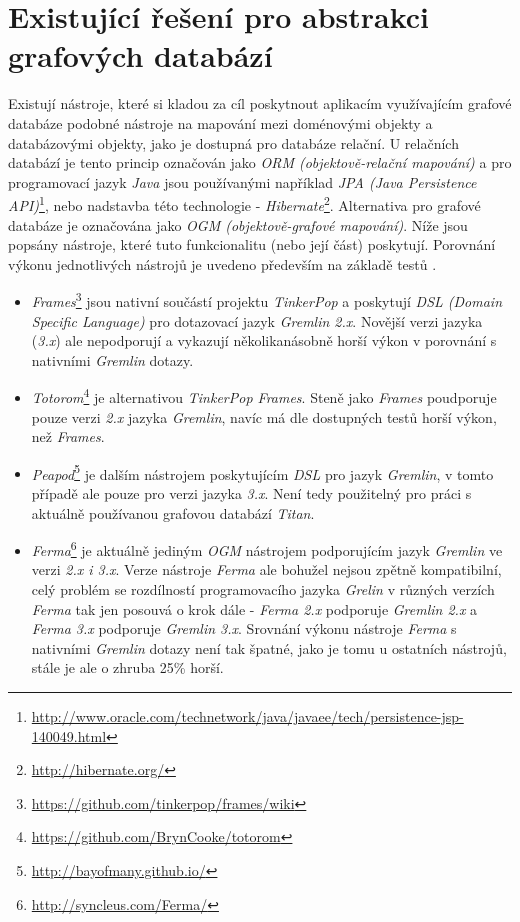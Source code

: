 \section{Existující řešení pro abstrakci grafových databází}
\label{sec:ana_state_of_art}
Existují nástroje, které si kladou za cíl poskytnout aplikacím využívajícím grafové databáze podobné nástroje na mapování mezi doménovými objekty a databázovými objekty, jako je dostupná pro databáze relační. U relačních databází je tento princip označován jako \textit{ORM (objektově-relační mapování)} a pro programovací jazyk \textit{Java} jsou používanými například \textit{JPA (Java Persistence API)}\footnote{\url{http://www.oracle.com/technetwork/java/javaee/tech/persistence-jsp-140049.html}}, nebo nadstavba této technologie - \textit{Hibernate}\footnote{\url{http://hibernate.org/}}. Alternativa pro grafové databáze je označována jako \textit{OGM (objektově-grafové mapování)}. Níže jsou popsány nástroje, které tuto funkcionalitu (nebo její část) poskytují. Porovnání výkonu jednotlivých nástrojů je uvedeno především na základě testů \cite{FermaBenchmarks}.

\begin{itemize}
	\item{\textit{Frames}}\footnote{\url{https://github.com/tinkerpop/frames/wiki}} jsou nativní součástí projektu \textit{TinkerPop} a poskytují \textit{DSL (Domain Specific Language)} pro dotazovací jazyk \textit{Gremlin 2.x}. Novější verzi jazyka (\textit{3.x}) ale nepodporují a vykazují několikanásobně horší výkon v porovnání s nativními \textit{Gremlin} dotazy.

	\item{\textit{Totorom}}\footnote{\url{https://github.com/BrynCooke/totorom}} je alternativou \textit{TinkerPop Frames}. Steně jako \textit{Frames} poudporuje pouze verzi \textit{2.x} jazyka \textit{Gremlin}, navíc má dle dostupných testů horší výkon, než \textit{Frames}.

	\item{\textit{Peapod}}\footnote{\url{http://bayofmany.github.io/}} je dalším nástrojem poskytujícím \textit{DSL} pro jazyk \textit{Gremlin}, v tomto případě ale pouze pro verzi jazyka \textit{3.x}. Není tedy použitelný pro práci s aktuálně používanou grafovou databází \textit{Titan}.

	\item{\textit{Ferma}}\footnote{\url{http://syncleus.com/Ferma/}} je aktuálně jediným \textit{OGM} nástrojem podporujícím jazyk \textit{Gremlin} ve verzi \textit{2.x i 3.x}. Verze nástroje \textit{Ferma} ale bohužel nejsou zpětně kompatibilní, celý problém se rozdílností programovacího jazyka \textit{Grelin} v různých verzích \textit{Ferma} tak jen posouvá o krok dále - \textit{Ferma 2.x} podporuje \textit{Gremlin 2.x} a \textit{Ferma 3.x} podporuje \textit{Gremlin 3.x}. Srovnání výkonu nástroje \textit{Ferma} s nativními \textit{Gremlin} dotazy není tak špatné, jako je tomu u ostatních nástrojů, stále je ale o zhruba 25\% horší.
\end{itemize}

